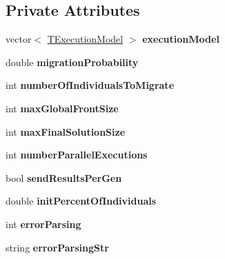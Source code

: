 \subsection*{Private Attributes}
\begin{DoxyCompactItemize}
\item 
\mbox{\label{classConfiguration_af8cb476fdbd47edeb09dc153841236fb}} 
vector$<$ \mbox{\hyperlink{structTExecutionModel}{T\+Execution\+Model}} $>$ {\bfseries execution\+Model}
\item 
\mbox{\label{classConfiguration_a9aa43691bd8a63fcb4d74cfda949c1bb}} 
double {\bfseries migration\+Probability}
\item 
\mbox{\label{classConfiguration_a1310dbc151e95f749f3857f843bb5b84}} 
int {\bfseries number\+Of\+Individuals\+To\+Migrate}
\item 
\mbox{\label{classConfiguration_a414242af9e6bdf14e7bf9b2af8ccb05e}} 
int {\bfseries max\+Global\+Front\+Size}
\item 
\mbox{\label{classConfiguration_a495da2d6bf684bd65aa87df74e61f36b}} 
int {\bfseries max\+Final\+Solution\+Size}
\item 
\mbox{\label{classConfiguration_a6c34b80545c09e85554063f678384d11}} 
int {\bfseries number\+Parallel\+Executions}
\item 
\mbox{\label{classConfiguration_a3c49a79ecb6caf9b3fc83f2b941c3fc2}} 
bool {\bfseries send\+Results\+Per\+Gen}
\item 
\mbox{\label{classConfiguration_a8da65d5ce2ecf3d45053808bbe0e0e85}} 
double {\bfseries init\+Percent\+Of\+Individuals}
\item 
\mbox{\label{classConfiguration_a9510dc1dc4399c12de569ae6c8c89ec2}} 
int {\bfseries error\+Parsing}
\item 
\mbox{\label{classConfiguration_a93c81edeed8a875788e691603d95b17f}} 
string {\bfseries error\+Parsing\+Str}
\item 

\end{DoxyCompactItemize}
